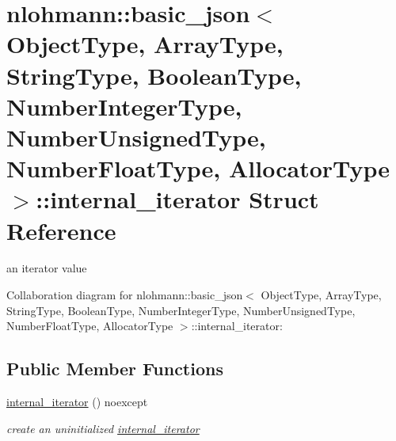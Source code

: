 \hypertarget{structnlohmann_1_1basic__json_1_1internal__iterator}{}\section{nlohmann\+:\+:basic\+\_\+json$<$ Object\+Type, Array\+Type, String\+Type, Boolean\+Type, Number\+Integer\+Type, Number\+Unsigned\+Type, Number\+Float\+Type, Allocator\+Type $>$\+:\+:internal\+\_\+iterator Struct Reference}
\label{structnlohmann_1_1basic__json_1_1internal__iterator}


an iterator value  




Collaboration diagram for nlohmann\+:\+:basic\+\_\+json$<$ Object\+Type, Array\+Type, String\+Type, Boolean\+Type, Number\+Integer\+Type, Number\+Unsigned\+Type, Number\+Float\+Type, Allocator\+Type $>$\+:\+:internal\+\_\+iterator\+:
\subsection*{Public Member Functions}
\begin{DoxyCompactItemize}
\item 
\hyperlink{structnlohmann_1_1basic__json_1_1internal__iterator_af7975e4fd91cdfc156e81df7c3c40b2b}{internal\+\_\+iterator} () noexcept
\begin{DoxyCompactList}\small\item\em create an uninitialized \hyperlink{structnlohmann_1_1basic__json_1_1internal__iterator}{internal\+\_\+iterator} \end{DoxyCompactList}\end{DoxyCompactItemize}
